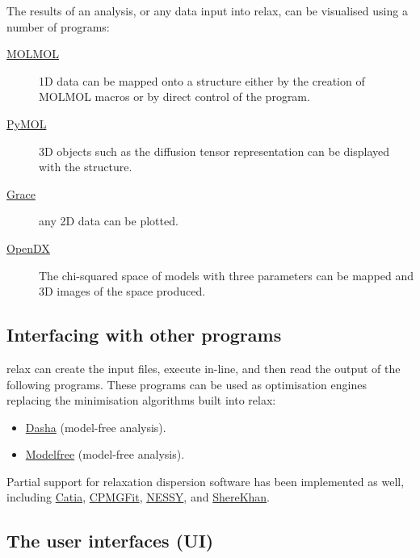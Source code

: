 The results of an analysis, or any data input into relax, can be visualised using a number of programs:
\begin{description}
  \item[\href{http://sourceforge.net/projects/molmol/}{MOLMOL}] 1D data can be mapped onto a structure either by the creation of MOLMOL macros or by direct control of the program.
  \item[\href{http://www.pymol.org/}{PyMOL}] 3D objects such as the diffusion tensor representation can be displayed with the structure.
  \item[\href{http://plasma-gate.weizmann.ac.il/Grace/}{Grace}] any 2D data can be plotted.
  \item[\href{http://www.opendx.org}{OpenDX}] The chi-squared space of models with three parameters can be mapped and 3D images of the space produced.
\end{description}



\subsection{Interfacing with other programs}

relax can create the input files, execute in-line, and then read the output of the following programs.
These programs can be used as optimisation engines replacing the minimisation algorithms built into relax:
\begin{itemize}
  \item \href{https://web.archive.org/web/http://www.nmr.ru/dasha.html}{Dasha} (model-free analysis).
  \item \href{http://www.palmer.hs.columbia.edu/software/modelfree.html}{Modelfree} (model-free analysis).
\end{itemize}

Partial support for relaxation dispersion software has been implemented as well, including \href{http://www.biochem.ucl.ac.uk/hansen/catia/}{Catia}, \href{http://www.palmer.hs.columbia.edu/software/cpmgfit.html}{CPMGFit}, \href{https://sourceforge.net/projects/nessy/}{NESSY}, and \href{http://sherekhan.bionmr.org/}{ShereKhan}.



\subsection{The user interfaces (UI)}

